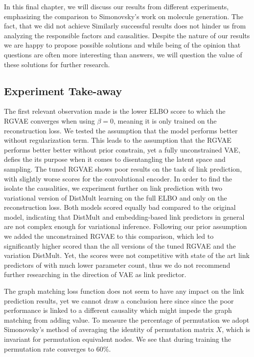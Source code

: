 

In this final chapter, we will discuss our results from different experiments, emphasizing the comparison to Simonovsky's work on molecule generation. The fact, that we did not achieve Similarly successful results does not hinder us from analyzing the responsible factors and causalities. Despite the nature of our results we are happy to propose possible solutions and while being of the opinion that questions are often more interesting than answers, we will question the value of these solutions for further research.

\subsection{Experiment Take-away}


The first relevant observation made is the lower ELBO score to which the RGVAE converges when using $\beta=0$, meaning it is only trained on the reconstruction loss.
We tested the assumption that the model performs better without regularization term. This leads to the assumption that the RGVAE performs better better without prior constrain, yet a fully unconstrained VAE, defies the its purpose when it comes to disentangling the latent space and sampling.
The tuned RGVAE shows poor results on the task of link prediction, with slightly worse scores for the convolutional encoder. In order to find the isolate the causalities, we experiment further on link prediction with two variational version of DistMult learning on the full ELBO and only on the reconstruction loss. Both models scored equally bad compared to the original model, indicating that DistMult and embedding-based link predictors in general are not complex enough for variational inference. Following our prior assumption we added the unconstrained RGVAE to this comparison, which led to significantly higher scored than the all versions of the tuned RGVAE and the variation DistMult. Yet, the scores were not competitive with state of the art link predictors of with much lower parameter count, thus we do not recommend further researching in the direction of VAE as link predictor.

The graph matching loss function does not seem to have any impact on the link prediction results, yet we cannot draw a conclusion here since since the poor performance is linked to a different causality which might impede the graph matching from adding value. To measure the percentage of permutation we adopt Simonovsky's method of averaging the identity of permutation matrix $X$, which is invariant for permutation equivalent nodes. We see that during training the permutation rate converges to $60$\%.

